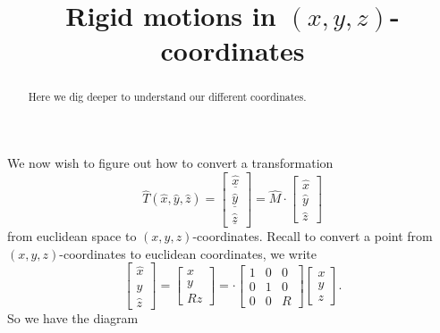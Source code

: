 \documentclass[newpage,hints,handout]{ximera}
\title{Rigid motions in $(x,y,z)$-coordinates}
\begin{document}
\begin{abstract}
  Here we dig deeper to understand our different coordinates.
\end{abstract}
\maketitle

We now wish to figure out how to convert a transformation
\[\hat{T}(\hat x,\hat y,\hat z)=
\begin{bmatrix}
\underline{\hat{x}} \\ \underline{\hat{y}} \\ \underline{\hat{z}}%
\end{bmatrix}
  =\hat{M} \cdot \begin{bmatrix}
\hat{x} \\ \hat{y} \\ \hat{z}%
\end{bmatrix} \label{100}%
\]
from euclidean space to $(x,y,z)$-coordinates. Recall to convert a
point from $(x,y,z)$-coordinates to euclidean coordinates, we write
\[
\begin{bmatrix}
\hat{x} \\ \hat{y} \\ \hat{z}%
\end{bmatrix}
=\begin{bmatrix}
  x \\ y \\ Rz
\end{bmatrix}
=\cdot\begin{bmatrix}
  1 & 0 & 0\\
  0 & 1 & 0\\
  0 & 0 & R
\end{bmatrix}
\begin{bmatrix}
  x \\ y \\ z
\end{bmatrix}.
\]
So we have the diagram%
\end{document}
